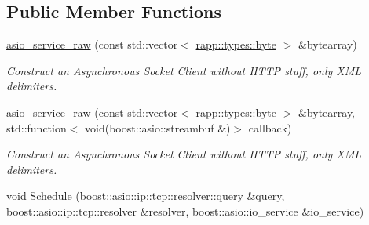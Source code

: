 \subsection*{Public Member Functions}
\begin{DoxyCompactItemize}
\item 
\hyperlink{classrapp_1_1services_1_1asio__service__raw_a9f6dc2b1905cd926ef7cef5c2616aefc}{asio\-\_\-service\-\_\-raw} (const std\-::vector$<$ \hyperlink{namespacerapp_1_1types_a1dbc9dc2ab4507d8fb58ac3a204d307b}{rapp\-::types\-::byte} $>$ \&bytearray)
\begin{DoxyCompactList}\small\item\em Construct an Asynchronous Socket Client without H\-T\-T\-P stuff, only X\-M\-L delimiters. \end{DoxyCompactList}\item 
\hyperlink{classrapp_1_1services_1_1asio__service__raw_aafd14d12bd6cb0000380263e454b3f26}{asio\-\_\-service\-\_\-raw} (const std\-::vector$<$ \hyperlink{namespacerapp_1_1types_a1dbc9dc2ab4507d8fb58ac3a204d307b}{rapp\-::types\-::byte} $>$ \&bytearray, std\-::function$<$ void(boost\-::asio\-::streambuf \&)$>$ callback)
\begin{DoxyCompactList}\small\item\em Construct an Asynchronous Socket Client without H\-T\-T\-P stuff, only X\-M\-L delimiters. \end{DoxyCompactList}\item 
void \hyperlink{classrapp_1_1services_1_1asio__service__raw_a11078ec812461792f81bca299db468ce}{Schedule} (boost\-::asio\-::ip\-::tcp\-::resolver\-::query \&query, boost\-::asio\-::ip\-::tcp\-::resolver \&resolver, boost\-::asio\-::io\-\_\-service \&io\-\_\-service)
\end{DoxyCompactItemize}
